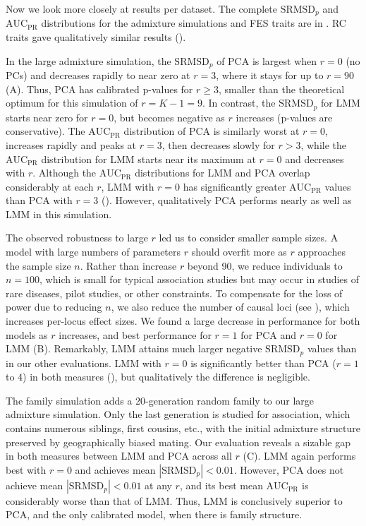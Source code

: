 \documentclass[9pt,lineno]{elife}
\newcommand{\rmsd}{\text{SRMSD}_p}
\newcommand{\auc}{\text{AUC}_\text{PR}}
\begin{document}
Now we look more closely at results per dataset.
The complete $\rmsd$ and $\auc$ distributions for the admixture simulations and FES traits are in .
RC traits gave qualitatively similar results ().

In the large admixture simulation, the $\rmsd$ of PCA is largest when $r=0$ (no PCs) and decreases rapidly to near zero at $r=3$, where it stays for up to $r=90$ (A).
Thus, PCA has calibrated p-values for $r \ge 3$, smaller than the theoretical optimum for this simulation of $r = K - 1 = 9$.
In contrast, the $\rmsd$ for LMM starts near zero for $r=0$, but becomes negative as $r$ increases (p-values are conservative).
The $\auc$ distribution of PCA is similarly worst at $r=0$, increases rapidly and peaks at $r = 3$, then decreases slowly for $r > 3$, while the $\auc$ distribution for LMM starts near its maximum at $r=0$ and decreases with $r$.
Although the $\auc$ distributions for LMM and PCA overlap considerably at each $r$, LMM with $r=0$ has significantly greater $\auc$ values than PCA with $r=3$ ().
However, qualitatively PCA performs nearly as well as LMM in this simulation.

The observed robustness to large $r$ led us to consider smaller sample sizes.
A model with large numbers of parameters $r$ should overfit more as $r$ approaches the sample size $n$.
Rather than increase $r$ beyond 90, we reduce individuals to $n = 100$, which is small for typical association studies but may occur in studies of rare diseases, pilot studies, or other constraints.
To compensate for the loss of power due to reducing $n$, we also reduce the number of causal loci (see ), which increases per-locus effect sizes.
We found a large decrease in performance for both models as $r$ increases, and best performance for $r=1$ for PCA and $r=0$ for LMM (B).
Remarkably, LMM attains much larger negative $\rmsd$ values than in our other evaluations.
LMM with $r=0$ is significantly better than PCA ($r=1$ to 4) in both measures (), but qualitatively the difference is negligible.

The family simulation adds a 20-generation random family to our large admixture simulation.
Only the last generation is studied for association, which contains numerous siblings, first cousins, etc., with the initial admixture structure preserved by geographically biased mating.
Our evaluation reveals a sizable gap in both measures between LMM and PCA across all $r$ (C).
LMM again performs best with $r=0$ and achieves mean $|\rmsd| < 0.01$.
However, PCA does not achieve mean $|\rmsd| < 0.01$ at any $r$, and its best mean $\auc$ is considerably worse than that of LMM.
Thus, LMM is conclusively superior to PCA, and the only calibrated model, when there is family structure.
\end{document}
